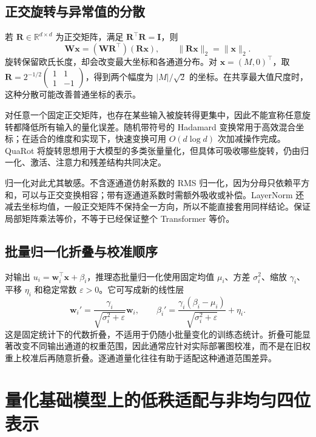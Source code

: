 \documentclass[UTF8,12pt,a4paper,fontset=fandol]{ctexart}
\begin{document}
\subsection{正交旋转与异常值的分散}
若 $\mathbf R\in\mathbb R^{d\times d}$ 为正交矩阵，满足 $\mathbf R^\top\mathbf R=\mathbf I$，则
\begin{equation}
 \mathbf W\mathbf x=(\mathbf W\mathbf R^\top)(\mathbf R\mathbf x),
 \qquad\|\mathbf R\mathbf x\|_2=\|\mathbf x\|_2.
 \label{eq:quant-rotation}
\end{equation}
旋转保留欧氏长度，却会改变最大坐标和各通道分布。对 $\mathbf x=(M,0)^\top$，取 $\mathbf R=2^{-1/2}\begin{pmatrix}1&1\\1&-1\end{pmatrix}$，得到两个幅度为 $|M|/\sqrt2$ 的坐标。在共享最大值尺度时，这种分散可能改善普通坐标的表示。

对任意一个固定正交矩阵，也存在某些输入被旋转得更集中，因此不能宣称任意旋转都降低所有输入的量化误差。随机带符号的 Hadamard 变换常用于高效混合坐标；在适合的维度和实现下，快速变换可用 $O(d\log d)$ 次加减操作完成。QuaRot 将旋转思想用于大模型的多类张量量化\cite{ashkboos2024}，但具体可吸收哪些旋转，仍由归一化、激活、注意力和残差结构共同决定。

归一化对此尤其敏感。不含逐通道仿射系数的 RMS 归一化，因为分母只依赖平方和，可以与正交变换相容；带有逐通道系数时需额外吸收或补偿。LayerNorm 还减去坐标均值，一般正交矩阵不保持全一方向，所以不能直接套用同样结论。保证局部矩阵乘法等价，不等于已经保证整个 Transformer 等价。

\subsection{批量归一化折叠与校准顺序}
对输出 $u_i=\mathbf w_i^\top\mathbf x+\beta_i$，推理态批量归一化使用固定均值 $\mu_i$、方差 $\sigma_i^2$、缩放 $\gamma_i$、平移 $\eta_i$ 和稳定常数 $\varepsilon>0$。它可写成新的线性层
\[
 \mathbf w_i'=\frac{\gamma_i}{\sqrt{\sigma_i^2+\varepsilon}}\mathbf w_i,
 \qquad
 \beta_i'=\frac{\gamma_i(\beta_i-\mu_i)}{\sqrt{\sigma_i^2+\varepsilon}}+\eta_i.
\]
这是固定统计下的代数折叠，不适用于仍随小批量变化的训练态统计。折叠可能显著改变不同输出通道的权重范围，因此通常应针对实际部署图校准，而不是在旧权重上校准后再随意折叠。逐通道量化往往有助于适配这种通道范围差异。

\section{量化基础模型上的低秩适配与非均匀四位表示}
\label{sec:quant-qlora}
\end{document}
